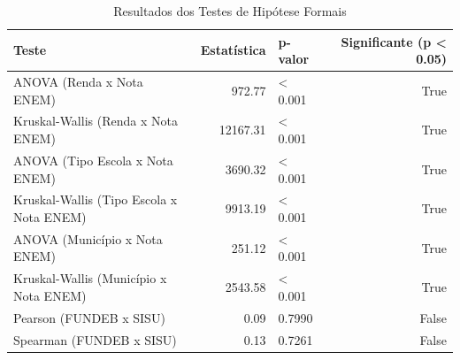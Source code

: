 \begin{table}
\caption{Resultados dos Testes de Hipótese Formais}
\label{tab:testes_estatisticos}
\begin{tabular}{lrlr}
\toprule
Teste & Estatística & p-valor & Significante (p < 0.05) \\
\midrule
ANOVA (Renda x Nota ENEM) & 972.77 & < 0.001 & True \\
Kruskal-Wallis (Renda x Nota ENEM) & 12167.31 & < 0.001 & True \\
ANOVA (Tipo Escola x Nota ENEM) & 3690.32 & < 0.001 & True \\
Kruskal-Wallis (Tipo Escola x Nota ENEM) & 9913.19 & < 0.001 & True \\
ANOVA (Município x Nota ENEM) & 251.12 & < 0.001 & True \\
Kruskal-Wallis (Município x Nota ENEM) & 2543.58 & < 0.001 & True \\
Pearson (FUNDEB x SISU) & 0.09 & 0.7990 & False \\
Spearman (FUNDEB x SISU) & 0.13 & 0.7261 & False \\
\bottomrule
\end{tabular}
\end{table}
